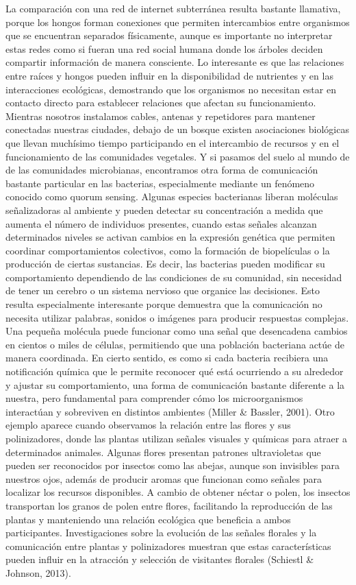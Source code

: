 \documentclass[12pt]{article}
\begin{document}
La comparación con una red de internet subterránea resulta bastante llamativa, porque los hongos forman conexiones que permiten intercambios entre organismos que se encuentran separados físicamente, aunque es importante no interpretar estas redes como si fueran una red social humana donde los árboles deciden compartir información de manera consciente. Lo interesante es que las relaciones entre raíces y hongos pueden influir en la disponibilidad de nutrientes y en las interacciones ecológicas, demostrando que los organismos no necesitan estar en contacto directo para establecer relaciones que afectan su funcionamiento. Mientras nosotros instalamos cables, antenas y repetidores para mantener conectadas nuestras ciudades, debajo de un bosque existen asociaciones biológicas que llevan muchísimo tiempo participando en el intercambio de recursos y en el funcionamiento de las comunidades vegetales.
Y si pasamos del suelo al mundo de de las comunidades microbianas, encontramos otra forma de comunicación bastante particular en las bacterias, especialmente mediante un fenómeno conocido como quorum sensing. Algunas especies bacterianas liberan moléculas señalizadoras al ambiente y pueden detectar su concentración a medida que aumenta el número de individuos presentes, cuando estas señales alcanzan determinados niveles se activan cambios en la expresión genética que permiten coordinar comportamientos colectivos, como la formación de biopelículas o la producción de ciertas sustancias. Es decir, las bacterias pueden modificar su comportamiento dependiendo de las condiciones de su comunidad, sin necesidad de tener un cerebro o un sistema nervioso que organice las decisiones.
Esto resulta especialmente interesante porque demuestra que la comunicación no necesita utilizar palabras, sonidos o imágenes para producir respuestas complejas. Una pequeña molécula puede funcionar como una señal que desencadena cambios en cientos o miles de células, permitiendo que una población bacteriana actúe de manera coordinada. En cierto sentido, es como si cada bacteria recibiera una notificación química que le permite reconocer qué está ocurriendo a su alrededor y ajustar su comportamiento, una forma de comunicación bastante diferente a la nuestra, pero fundamental para comprender cómo los microorganismos interactúan y sobreviven en distintos ambientes (Miller & Bassler, 2001).
Otro ejemplo aparece cuando observamos la relación entre las flores y sus polinizadores, donde las plantas utilizan señales visuales y químicas para atraer a determinados animales. Algunas flores presentan patrones ultravioletas que pueden ser reconocidos por insectos como las abejas, aunque son invisibles para nuestros ojos, además de producir aromas que funcionan como señales para localizar los recursos disponibles. A cambio de obtener néctar o polen, los insectos transportan los granos de polen entre flores, facilitando la reproducción de las plantas y manteniendo una relación ecológica que beneficia a ambos participantes. Investigaciones sobre la evolución de las señales florales y la comunicación entre plantas y polinizadores muestran que estas características pueden influir en la atracción y selección de visitantes florales (Schiestl & Johnson, 2013).
\end{document}
